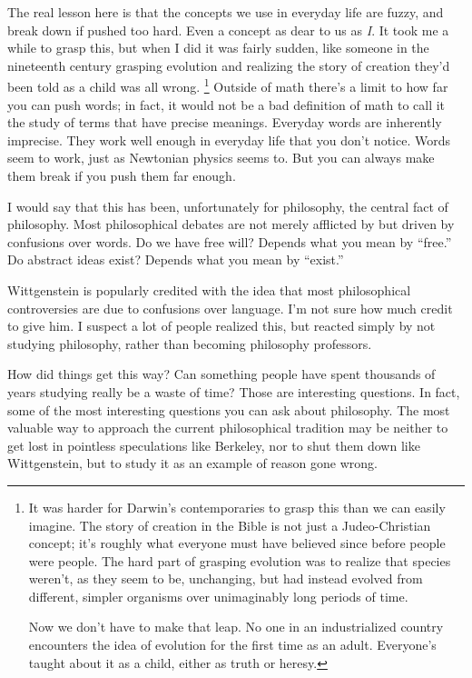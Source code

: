 \documentclass[12pt]{book}
\begin{document}
The real lesson here is that the concepts we use in everyday life are
fuzzy, and break down if pushed too hard. Even a concept as dear to us
as \emph{I}. It took me a while to grasp this, but when I did it was
fairly sudden, like someone in the nineteenth century grasping evolution
and realizing the story of creation they'd been told as a child was all
wrong. \footnote{It was harder for Darwin's contemporaries to grasp this than we
can easily imagine. The story of creation in the Bible is not just a
Judeo-Christian concept; it's roughly what everyone must have believed
since before people were people. The hard part of grasping evolution was
to realize that species weren't, as they seem to be, unchanging, but had
instead evolved from different, simpler organisms over unimaginably long
periods of time.

Now we don't have to make that leap. No one in an industrialized country
encounters the idea of evolution for the first time as an adult.
Everyone's taught about it as a child, either as truth or heresy.} Outside of math there's a limit to how
far you can push words; in fact, it would not be a bad definition of
math to call it the study of terms that have precise meanings. Everyday
words are inherently imprecise. They work well enough in everyday life
that you don't notice. Words seem to work, just as Newtonian physics
seems to. But you can always make them break if you push them far
enough.

I would say that this has been, unfortunately for philosophy, the
central fact of philosophy. Most philosophical debates are not merely
afflicted by but driven by confusions over words. Do we have free will?
Depends what you mean by ``free.'' Do abstract ideas exist? Depends what
you mean by ``exist.''

Wittgenstein is popularly credited with the idea that most philosophical
controversies are due to confusions over language. I'm not sure how much
credit to give him. I suspect a lot of people realized this, but reacted
simply by not studying philosophy, rather than becoming philosophy
professors.

How did things get this way? Can something people have spent thousands
of years studying really be a waste of time? Those are interesting
questions. In fact, some of the most interesting questions you can ask
about philosophy. The most valuable way to approach the current
philosophical tradition may be neither to get lost in pointless
speculations like Berkeley, nor to shut them down like Wittgenstein, but
to study it as an example of reason gone wrong.
\end{document}
